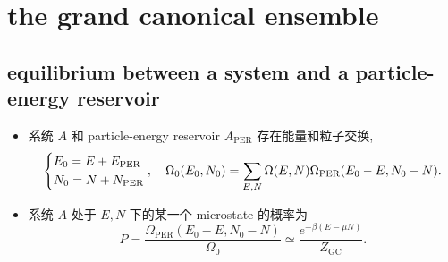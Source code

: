 \chapter{the grand canonical ensemble}
\section{equilibrium between a system and a particle-energy reservoir}
\begin{itemize}
	\item 系统 $A$ 和 particle-energy reservoir $A_\text{PER}$ 存在能量和粒子交换,
	\begin{equation}
		\begin{dcases}
			E_0 = E + E_\text{PER} \\
			N_0 = N + N_\text{PER}
		\end{dcases}, \quad \Omega_0(E_0, N_0) = \sum_{E, N} \Omega(E, N) \Omega_\text{PER}(E_0 - E, N_0 - N).
	\end{equation}
	
	\item 系统 $A$ 处于 $E, N$ 下的某一个 microstate 的概率为
	\begin{equation}
		P = \frac{\Omega_\text{PER}(E_0 - E, N_0 - N)}{\Omega_0} \simeq \frac{e^{- \beta (E - \mu N)}}{Z_\text{GC}}.
	\end{equation}
\end{itemize}

